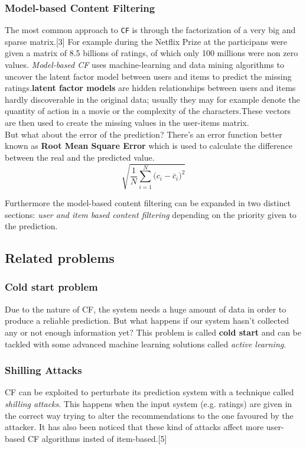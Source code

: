 \documentclass{sig-alternate-05-2015}
\begin{document}
\subsubsection{Model-based Content Filtering}
The most common approach to \texttt{CF} is through the factorization
of a very big and sparse matrix.[3] For example during the Netflix
Prize at the participans were given a matrix of 8.5 billions of ratings,
of which only 100 millions were non zero values.
\textit{Model-based CF} uses machine-learning and data mining algorithms
to uncover the latent factor model between users and items to
predict the missing ratings.\textbf{latent factor models} are hidden
relationships between users and items hardly discoverable in the original data;
usually they may for example denote the quantity of action in a movie or the complexity
of the characters.These vectors are then used to create the missing values in the user-items
matrix.\\
But what about the error of the prediction? There's an error function better known as %
\textbf{Root Mean Square Error} which is used to calculate the difference
between the real and the predicted value.\\
\begin{equation}
{\sqrt {\frac{1} {N}{\sum\limits_{i = 1}^N {(c_{i} - \bar{c}_{i} } })^{2} } }
\end{equation}

Furthermore the model-based content filtering can be expanded in two distinct sections:
\textit{user and item based content filtering} depending on the priority given to the
prediction.


\subsection{Related problems}
\subsubsection{Cold start problem}
Due to the nature of CF, the system needs a huge amount of data
in order to produce a reliable prediction. But what happens if our system
hasn't collected any or not enough information yet?
This problem is called \textbf{cold start} and can be tackled with some advanced
machine learning solutions called \textit{active learning}.

\subsubsection{Shilling Attacks}
CF can be exploited to perturbate its prediction system with a technique
called \textit{shilling attacks}. This happens when the input system (e.g. ratings)
are given in the correct way trying to alter the recommendations to the one
favoured by the attacker. It has also been noticed that these kind of attacks affect
more user-based CF algorithms insted of item-based.[5]
\end{document}
